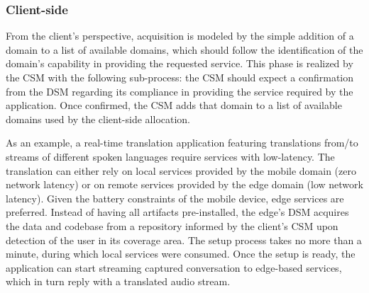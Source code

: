 \subsubsection*{Client-side} From the client's perspective, acquisition is modeled by the simple addition of a domain to a list of available domains, which should follow the identification of the domain's capability in providing the requested service. This phase is realized by the CSM with the following sub-process: the CSM should expect a confirmation from the DSM regarding its compliance in providing the service required by the application. Once confirmed, the CSM adds that domain to a list of available domains used by the client-side allocation. 

As an example, a real-time translation application featuring translations from/to streams of different spoken languages require services with low-latency. The translation can either rely on local services provided by the mobile domain (zero network latency) or on remote services provided by the edge domain (low network latency). Given the battery constraints of the mobile device, edge services are preferred. Instead of having all artifacts pre-installed, the edge's DSM acquires the data and codebase from a repository informed by the client's CSM upon detection of the user in its coverage area. The setup process takes no more than a minute, during which local services were consumed. Once the setup is ready, the application can start streaming captured conversation to edge-based services, which in turn reply with a translated audio stream.





